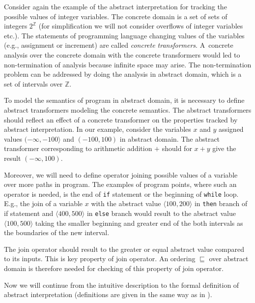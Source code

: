 \documentclass[a4paper, 12pt]{article}
\newcommand{\interval}[2]{\langle #1,#2 \rangle}
\newcommand{\aord}[0]{\sqsubseteq}
\begin{document}
Consider again the example of the abstract interpretation for tracking
the possible values of integer variables.
The concrete domain is a set of sets of integers $2^\mathbb{Z}$ (for simplification
we will not consider overflows of integer variables etc.).
The statements of programming language changing values of the variables
(e.g., assignment or increment) are called \emph{concrete transformers}.
A~concrete analysis over the concrete domain with the concrete transformers
would led to non-termination of analysis because infinite space may arise.
The non-termination problem can be addressed by doing the analysis in abstract domain,
which is a set of intervals over $\mathbb{Z}$.

To model the semantics of program in abstract domain, it is necessary to define
abstract transformers modeling the concrete semantics.
The abstract transformers should reflect an effect of a concrete transformer
on the properties tracked by abstract interpretation.
In our example, consider the variables $x$ and $y$ assigned values $(-\infty,-100\rangle$
and $(-100, 100)$ in abstract domain.
The abstract transformer corresponding to arithmetic addition $+$
should for $x+y$ give the result $(-\infty,100)$.

Moreover, we will need to define operator joining possible values
of a variable over more paths in program.
The examples of program points, where such an operator is needed, is
the end of \texttt{if} statement or the beginning of \texttt{while} loop.
E.g., the join of a variable $x$
with the abstract value $\interval{100}{200}$ in \texttt{then} branch
of if statement and $\interval{400}{500}$ in \texttt{else} branch
would result to the abstract value $\interval{100}{500}$ taking the smaller beginning
and greater end of the both intervals as the boundaries of the new interval.

The join operator should result to the greater or
equal abstract value compared to its inputs.
This is key property of join operator.
An ordering $\aord$ over abstract domain is therefore needed
for checking of this property of join operator.

Now we will continue from the intuitive description to
the formal definition of abstract interpretation (definitions
are given in the same way as in \cite{popl77}).
\end{document}
